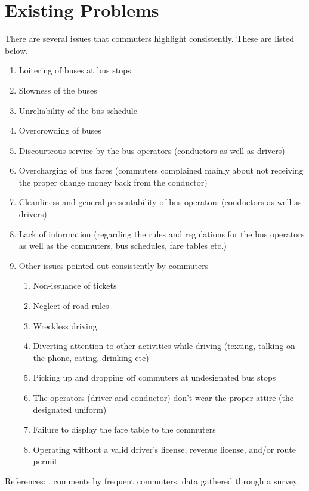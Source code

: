 \documentclass[12pt, oneside]{report}
\begin{document}
\section{Existing Problems}
\label{section-ExistingProblems}
There are several issues that commuters highlight consistently. These are listed below. 
\begin {enumerate}
\item Loitering of buses at bus stops
\item Slowness of the buses
\item Unreliability of the bus schedule
\item Overcrowding of buses
\item Discourteous service by the bus operators (conductors as well as drivers)
\item Overcharging of bus fares (commuters complained mainly about not receiving the proper change money back from the conductor)
\item Cleanliness and general presentability of bus operators (conductors as well as drivers)
\item Lack of information (regarding the rules and regulations for the bus operators as well as the commuters, bus schedules, fare tables etc.)
\item Other issues pointed out consistently by commuters
	\begin {enumerate}
	\item Non-issuance of tickets
	\item Neglect of road rules
	\item Wreckless driving
	\item Diverting attention to other activities while driving (texting, talking on the phone, eating, drinking etc)
	\item Picking up and dropping off commuters at undesignated bus stops
	\item The operators (driver and conductor) don't wear the proper attire (the designated uniform)
	\item Failure to display the fare table to the commuters
	\item Operating without a valid driver's license, revenue license, and/or route permit
	\end {enumerate}
\end {enumerate}
References: \citep{Wickremasekara2012, Range2012}, comments by frequent commuters, data gathered through a survey.

\newpage
\end{document}

